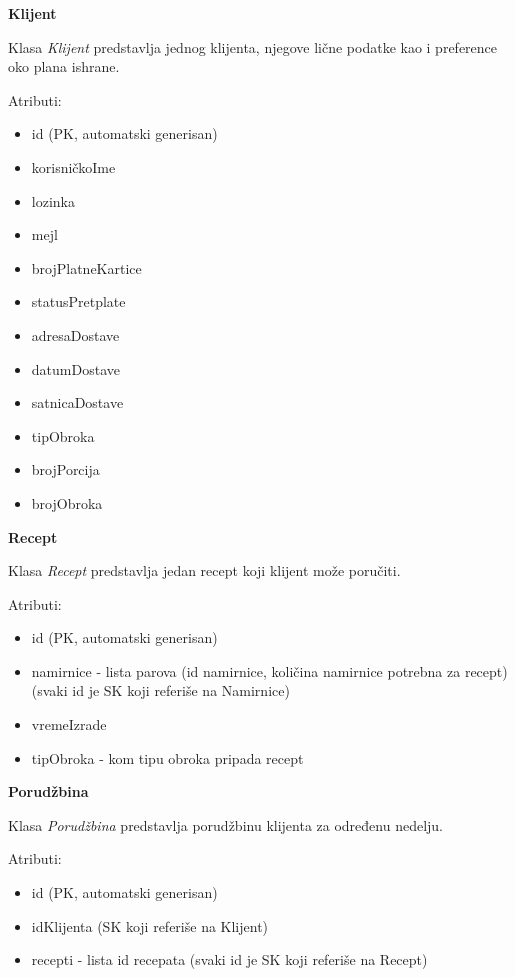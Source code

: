 \textbf{\large Klijent}
\vspace{0.3cm}

Klasa \textit{Klijent} predstavlja jednog klijenta, njegove lične podatke kao i preference oko plana ishrane.

Atributi:
\begin{itemize}
    \item id (PK, automatski generisan)
    \item korisničkoIme 
    \item lozinka
    \item mejl
    \item brojPlatneKartice
    \item statusPretplate
    \item adresaDostave
    \item datumDostave
    \item satnicaDostave
    \item tipObroka
    \item brojPorcija
    \item brojObroka
\end{itemize}

\textbf{\large Recept}
\vspace{0.3cm}

Klasa \textit{Recept} predstavlja jedan recept koji klijent može poručiti.

Atributi:
\begin{itemize}
    \item id (PK, automatski generisan)
    \item namirnice - lista parova (id namirnice, količina namirnice potrebna za recept) (svaki id je SK koji referiše na Namirnice)
    \item vremeIzrade
    \item tipObroka - kom tipu obroka pripada recept
\end{itemize}

\textbf{\large Porudžbina}
\vspace{0.3cm}

Klasa \textit{Porudžbina} predstavlja porudžbinu klijenta za određenu nedelju.

Atributi:
\begin{itemize}
    \item id (PK, automatski generisan)
    \item idKlijenta (SK koji referiše na Klijent)
    \item recepti - lista id recepata (svaki id je SK koji referiše na Recept)
\end{itemize}